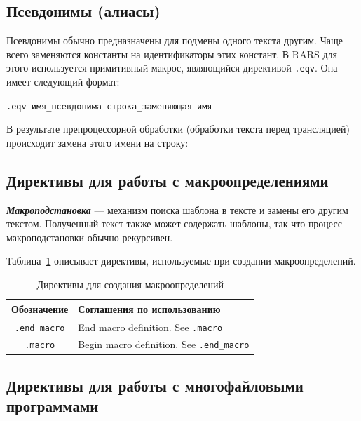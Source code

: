 
\subsection{Псевдонимы (алиасы)}

Псевдонимы обычно предназначены для подмены одного текста другим. Чаще всего заменяются константы на идентификаторы этих констант. В RARS для этого используется примитивный макрос, являющийся директивой \verb|.eqv|. Она имеет следующий формат:

\begin{center}
\verb|.eqv имя_псевдонима строка_заменяющая имя|
\end{center}
В результате препроцессорной обработки (обработки текста перед трансляцией) происходит замена этого имени на строку:

\subsection{Директивы для работы с макроопределениями}

\textbf{\textit{Макроподстановка}} — механизм поиска шаблона в тексте и замены его другим текстом. Полученный текст также может содержать шаблоны, так что процесс макроподстановки обычно рекурсивен.

Таблица~\ref{table-macro-direct} описывает директивы, используемые при создании макроопределений.

\begin{table}[h]
    \caption{Директивы для создания макроопределений}
    \centering
    \begin{tabularx}{\textwidth}{|c|X|}
        \hline
        \textbf{Обозначение} & \textbf{Соглашения по использованию} \\
        \hline %
        \verb|.end_macro| & End macro definition.  See \verb|.macro| \\
        \hline
        \verb|.macro| & Begin macro definition.  See \verb|.end_macro| \\
        \hline
    \end{tabularx}
    \label{table-macro-direct}
\end{table}

\subsection{Директивы для работы с многофайловыми программами}

